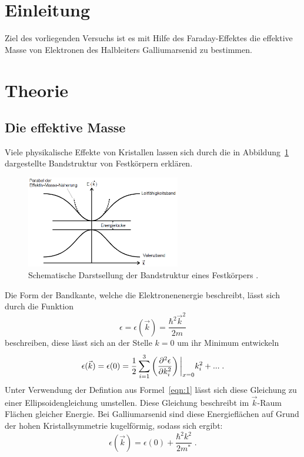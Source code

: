 \section{Einleitung}
Ziel des vorliegenden Versuchs ist es mit Hilfe des Faraday-Effektes die effektive
Masse von Elektronen des Halbleiters Galliumarsenid zu bestimmen.
\section{Theorie}
\subsection{Die effektive Masse}
Viele physikalische Effekte von Kristallen lassen sich durch die in Abbildung~\ref{fig:band}
dargestellte Bandstruktur von Festkörpern erklären.
\begin{figure}
  \centering
  \includegraphics[width=0.6\textwidth]{graphics/band.png}
  \caption{Schematische Darstsellung der Bandstruktur eines Festkörpers \cite{anleitung}.}
  \label{fig:band}
\end{figure}
Die Form der Bandkante, welche die Elektronenenergie beschreibt, lässt sich durch die Funktion
\begin{equation}
  \epsilon = \epsilon(\vec{k}) = \frac{\hbar^2\vec{k}^2}{2m}
  \label{eqn:1}
\end{equation}
beschreiben, diese lässt sich an der Stelle $k=0$ um ihr Minimum entwickeln
\begin{equation}
  \epsilon(\vec{k}) = \epsilon(0) = \frac{1}{2}\sum_{i=1}^3 \left(\frac{\partial^2 \epsilon}{\partial k_i^2}\right)\bigg{\vert}_{x=0} k_i^2 + ...\;.
\end{equation}
Unter Verwendung der Defintion aus Formel~\eqref{eqn:1} lässt sich diese Gleichung zu einer Ellipsoidengleichung umstellen. Diese Gleichung beschreibt
im $\vec{k}$-Raum Flächen gleicher Energie. Bei Galliumarsenid sind diese Energieflächen auf Grund der hohen Kristallsymmetrie kugelförmig, sodass
sich ergibt:
\begin{equation}
  \epsilon(\vec{k}) = \epsilon(0) + \frac{\hbar^2k^2}{2m^{*}}\;.
\end{equation}

